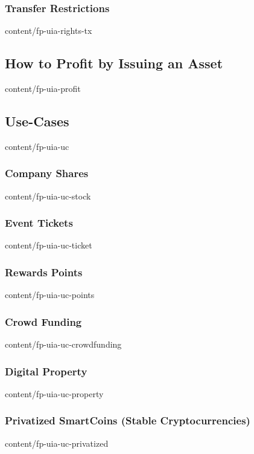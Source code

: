 \documentclass[conference,final,10pt,a4paper]{IEEEtran}
\begin{document}
\subsubsection  { Transfer Restrictions                            }  { content/fp-uia-rights-tx       } 
\subsection     { How to Profit by Issuing an Asset                }  { content/fp-uia-profit          } 
\subsection     { Use-Cases                                        }  { content/fp-uia-uc              } 
\subsubsection  { Company Shares                                   }  { content/fp-uia-uc-stock        } 
\subsubsection  { Event Tickets                                    }  { content/fp-uia-uc-ticket       } 
\subsubsection  { Rewards Points                                   }  { content/fp-uia-uc-points       } 
\subsubsection  { Crowd Funding                                    }  { content/fp-uia-uc-crowdfunding } 
\subsubsection  { Digital Property                                 }  { content/fp-uia-uc-property     } 
\subsubsection  { Privatized SmartCoins (Stable Cryptocurrencies)  }  { content/fp-uia-uc-privatized   } 
\end{document}
